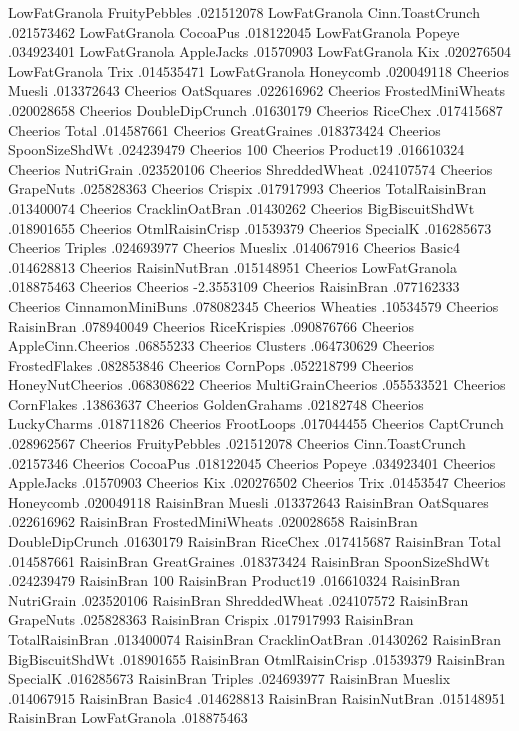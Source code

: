 LowFatGranola	FruityPebbles	.021512078
LowFatGranola	Cinn.ToastCrunch	.021573462
LowFatGranola	CocoaPus	.018122045
LowFatGranola	Popeye	.034923401
LowFatGranola	AppleJacks	.01570903
LowFatGranola	Kix	.020276504
LowFatGranola	Trix	.014535471
LowFatGranola	Honeycomb	.020049118
Cheerios	Muesli	.013372643
Cheerios	OatSquares	.022616962
Cheerios	FrostedMiniWheats	.020028658
Cheerios	DoubleDipCrunch	.01630179
Cheerios	RiceChex	.017415687
Cheerios	Total	.014587661
Cheerios	GreatGraines	.018373424
Cheerios	SpoonSizeShdWt	.024239479
Cheerios	100%
Cheerios	Product19	.016610324
Cheerios	NutriGrain	.023520106
Cheerios	ShreddedWheat	.024107574
Cheerios	GrapeNuts	.025828363
Cheerios	Crispix	.017917993
Cheerios	TotalRaisinBran	.013400074
Cheerios	CracklinOatBran	.01430262
Cheerios	BigBiscuitShdWt	.018901655
Cheerios	OtmlRaisinCrisp	.01539379
Cheerios	SpecialK	.016285673
Cheerios	Triples	.024693977
Cheerios	Mueslix	.014067916
Cheerios	Basic4	.014628813
Cheerios	RaisinNutBran	.015148951
Cheerios	LowFatGranola	.018875463
Cheerios	Cheerios	-2.3553109
Cheerios	RaisinBran	.077162333
Cheerios	CinnamonMiniBuns	.078082345
Cheerios	Wheaties	.10534579
Cheerios	RaisinBran	.078940049
Cheerios	RiceKrispies	.090876766
Cheerios	AppleCinn.Cheerios	.06855233
Cheerios	Clusters	.064730629
Cheerios	FrostedFlakes	.082853846
Cheerios	CornPops	.052218799
Cheerios	HoneyNutCheerios	.068308622
Cheerios	MultiGrainCheerios	.055533521
Cheerios	CornFlakes	.13863637
Cheerios	GoldenGrahams	.02182748
Cheerios	LuckyCharms	.018711826
Cheerios	FrootLoops	.017044455
Cheerios	CaptCrunch	.028962567
Cheerios	FruityPebbles	.021512078
Cheerios	Cinn.ToastCrunch	.02157346
Cheerios	CocoaPus	.018122045
Cheerios	Popeye	.034923401
Cheerios	AppleJacks	.01570903
Cheerios	Kix	.020276502
Cheerios	Trix	.01453547
Cheerios	Honeycomb	.020049118
RaisinBran	Muesli	.013372643
RaisinBran	OatSquares	.022616962
RaisinBran	FrostedMiniWheats	.020028658
RaisinBran	DoubleDipCrunch	.01630179
RaisinBran	RiceChex	.017415687
RaisinBran	Total	.014587661
RaisinBran	GreatGraines	.018373424
RaisinBran	SpoonSizeShdWt	.024239479
RaisinBran	100%
RaisinBran	Product19	.016610324
RaisinBran	NutriGrain	.023520106
RaisinBran	ShreddedWheat	.024107572
RaisinBran	GrapeNuts	.025828363
RaisinBran	Crispix	.017917993
RaisinBran	TotalRaisinBran	.013400074
RaisinBran	CracklinOatBran	.01430262
RaisinBran	BigBiscuitShdWt	.018901655
RaisinBran	OtmlRaisinCrisp	.01539379
RaisinBran	SpecialK	.016285673
RaisinBran	Triples	.024693977
RaisinBran	Mueslix	.014067915
RaisinBran	Basic4	.014628813
RaisinBran	RaisinNutBran	.015148951
RaisinBran	LowFatGranola	.018875463
